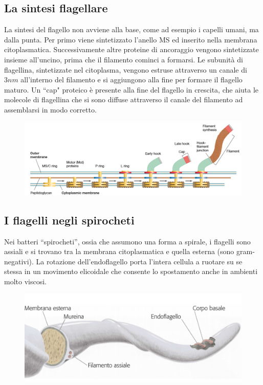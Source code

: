 \subsection{La sintesi flagellare}
La sintesi del flagello non avviene alla base, come ad esempio i capelli umani, ma dalla punta. Per primo viene sintetizzato l’anello MS ed inserito nella 
membrana citoplasmatica. Successivamente altre proteine di ancoraggio vengono sintetizzate insieme all’uncino, prima che il filamento cominci a formarsi. Le 
subunità di flagellina, sintetizzate nel citoplasma, vengono estruse attraverso un canale di $3 nm$ all'interno del filamento e si aggiungono alla fine per 
formare il flagello maturo. Un ``cap" proteico è presente alla fine del flagello in crescita, che aiuta le molecole di flagellina che si sono diffuse 
attraverso il canale del filamento ad assemblarsi in modo corretto. 
\begin{figure}[H]
	\includegraphics[width=\textwidth]{Pictures/19.png}
\end{figure}
\subsection{I flagelli negli spirocheti}
Nei batteri ``spirocheti”, ossia che assumono una forma a spirale, i flagelli sono assiali e si trovano tra la membrana citoplasmatica e quella esterna (sono 
gram-negativi). La rotazione dell’endoflagello porta l’intera cellula a ruotare su se stessa in un movimento elicoidale che consente lo spostamento anche in 
ambienti molto viscosi.
\begin{figure}[H]
	\includegraphics[width=\textwidth]{Pictures/20.png}
\end{figure}
